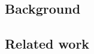 \documentclass[../main.tex]{subfiles}
\begin{document}
\subsection{Background}

\blindtext

\subsection{Related work}




\blindtext
\end{document}
